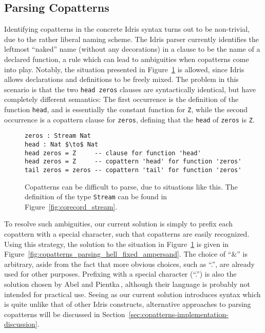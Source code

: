 \subsection{Parsing Copatterns}
\label{sec:parsing-copatterns}
Identifying copatterns in the concrete Idris syntax turns out to be non-trivial,
due to the rather liberal naming scheme. The Idris parser currently identifies
the leftmost ``naked'' name (without any decorations) in a clause to be the name
of a declared function, a rule which can lead to ambiguities when copatterns
come into play. Notably, the situation presented in
Figure~\ref{fig:copatterns_parsing_hell} is allowed, since Idris allows
declarations and definitions to be freely mixed. The problem in this scenario is
that the two \texttt{head zeros} clauses are syntactically identical, but have
completely different semantics: The first occurrence is the definition of the
function \texttt{head}, and is essentially the constant function for \texttt{Z},
while the second occurrence is a copattern clause for \texttt{zeros}, defining
that the \texttt{head} of \texttt{zeros} is \texttt{Z}.
\begin{figure}
\begin{lstlisting}[mathescape]
zeros : Stream Nat
head : Nat $\to$ Nat
head zeros = Z     -- clause for function 'head'
head zeros = Z     -- copattern 'head' for function 'zeros'
tail zeros = zeros -- copattern 'tail' for function 'zeros'
\end{lstlisting}
  \caption{Copatterns can be difficult to parse, due to situations like
    this. The definition of the type \texttt{Stream} can be found in Figure~\ref{fig:corecord_stream}.}
  \label{fig:copatterns_parsing_hell}
\end{figure}

To resolve such ambiguities, our current solution is simply to prefix each
copattern with a special character, such that copatterns are easily
recognized. Using this strategy, the solution to the situation in
Figure~\ref{fig:copatterns_parsing_hell} is given in
Figure~\ref{fig:copatterns_parsing_hell_fixed_ampersand}. The choice of ``\&''
is arbitrary, aside from the fact that more obvious choices, such as ``.'', are
already used for other purposes. Prefixing with a special character (``.'') is also
the solution chosen by Abel and Pientka\,\citep{Abel13Wellfounded}, although
their language is probably not intended for practical use. Seeing as our current
solution introduces syntax which is quite unlike that of other Idris
constructs, alternative approaches to parsing copatterns will be discussed in
Section~\ref{sec:copatterns-implementation-discussion}.


